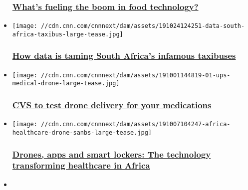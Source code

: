 \begin{itemize}
  \hypertarget{whats-fueling-the-boom-in-food-technology}{%
  \subsubsection{\texorpdfstring{\href{/2019/11/04/business/israel-food-technology/index.html}{What's
  fueling the boom in food
  technology?}}{What's fueling the boom in food technology?}}\label{whats-fueling-the-boom-in-food-technology}}
\item
  \href{/2019/10/31/business/data-south-africa-taxibuses/index.html}{}

  \texttt{[image: //cdn.cnn.com/cnnnext/dam/assets/191024124251-data-south-africa-taxibus-large-tease.jpg]}

  \hypertarget{how-data-is-taming-south-africas-infamous-taxibuses}{%
  \subsubsection{\texorpdfstring{\href{/2019/10/31/business/data-south-africa-taxibuses/index.html}{How
  data is taming South Africa's infamous
  taxibuses}}{How data is taming South Africa's infamous taxibuses}}\label{how-data-is-taming-south-africas-infamous-taxibuses}}
\item
  \href{/2019/10/21/tech/cvs-ups-drone/index.html}{}

  \texttt{[image: //cdn.cnn.com/cnnnext/dam/assets/191001144819-01-ups-medical-drone-large-tease.jpg]}

  \hypertarget{cvs-to-test-drone-delivery-for-your-medications}{%
  \subsubsection{\texorpdfstring{\href{/2019/10/21/tech/cvs-ups-drone/index.html}{CVS
  to test drone delivery for your
  medications}}{CVS to test drone delivery for your medications}}\label{cvs-to-test-drone-delivery-for-your-medications}}
\item
  \href{/2019/10/15/tech/tech-africa-healthcare/index.html}{}

  \texttt{[image: //cdn.cnn.com/cnnnext/dam/assets/191007104247-africa-healthcare-drone-sanbs-large-tease.jpg]}

  \hypertarget{drones-apps-and-smart-lockers-the-technology-transforming-healthcare-in-africa}{%
  \subsubsection{\texorpdfstring{\href{/2019/10/15/tech/tech-africa-healthcare/index.html}{Drones,
  apps and smart lockers: The technology transforming healthcare in
  Africa}}{Drones, apps and smart lockers: The technology transforming healthcare in Africa}}\label{drones-apps-and-smart-lockers-the-technology-transforming-healthcare-in-africa}}
\item
  \href{/2019/09/27/business/technology-fashion-sustainability/index.html}{}


\end{itemize}
